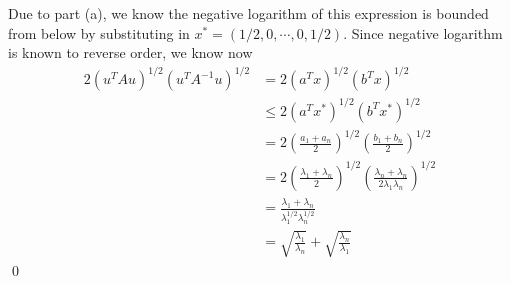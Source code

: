 \documentclass[12pt,a4paper]{article}
\renewcommand{\l}{\left}\renewcommand{\r}{\right}
\begin{document}
Due to part (a), we know the negative logarithm of this expression is bounded from below by substituting in $x^\ast = (1/2, 0, \cdots, 0, 1/2)$. Since negative logarithm is known to reverse order, we know now 
\begin{align*}
2\l(u^TAu\r)^{1/2}\l(u^TA^{-1}u\r)^{1/2} &= 2(a^Tx)^{1/2}(b^Tx)^{1/2}\\
&\leq 2(a^T x^\ast)^{1/2}(b^Tx^\ast)^{1/2} \\
&= 2\l(\frac{a_1+a_n}2\r)^{1/2}\l(\frac{b_1+b_n}2\r)^{1/2} \\
&= 2\l(\frac{\lambda_1+\lambda_n}2\r)^{1/2}\l(\frac{\lambda_n+\lambda_n}{2\lambda_1\lambda_n}\r)^{1/2} \\
&= \frac{\lambda_1+\lambda_n}{\lambda_1^{1/2}\lambda_n^{1/2}} \\
&= \sqrt{\frac{\lambda_1}{\lambda_n}} + \sqrt{\frac{\lambda_n}{\lambda_1}}
\end{align*}
\qed
\end{document}
